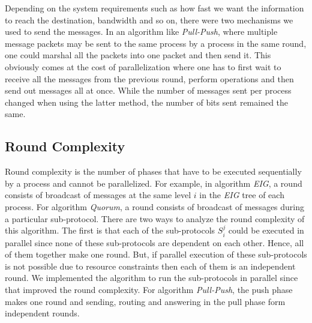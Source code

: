     Depending on the system requirements such as how fast we want the information to reach the destination, bandwidth and so on, there were two mechanisms we used to send the messages. In an algorithm like \textit{Pull-Push}, where multiple message packets may be sent to the same process by a process in the same round, one could marshal all the packets into one packet and then send it. This obviously comes at the cost of parallelization where one has to first wait to receive all the messages from the previous round, perform operations and then send out messages all at once. While the number of messages sent per process changed when using the latter method, the number of bits sent remained the same.


\subsection{Round Complexity}
Round complexity is the number of phases that have to be executed sequentially by a process and cannot be parallelized. For example, in algorithm \textit{EIG}, a round consists of broadcast of messages at the same level $i$ in the \textit{EIG} tree of each process. For algorithm \textit{Quorum}, a round consists of broadcast of messages during a particular sub-protocol. There are two ways to analyze the round complexity of this algorithm. The first is that each of the sub-protocols $S_i^j$ could be executed in parallel since none of these sub-protocols are dependent on each other. Hence, all of them together make one round. But, if parallel execution of these sub-protocols is not possible due to resource constraints then each of them is an independent round. We implemented the algorithm to run the sub-protocols in parallel since that improved the round complexity. For algorithm \textit{Pull-Push}, the push phase makes one round and sending, routing and answering in the pull phase form independent rounds.

